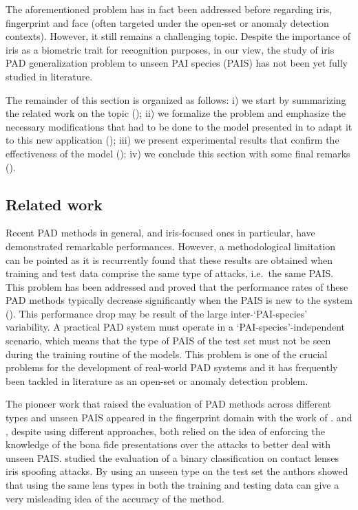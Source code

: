 The aforementioned problem has in fact been addressed before regarding iris, fingerprint and face (often targeted under the open-set or anomaly detection contexts). However, it still remains a challenging topic. Despite the importance of iris as a biometric trait for recognition purposes, in our view, the study of iris PAD generalization problem to unseen PAI species (PAIS) has not been yet fully studied in literature.

The remainder of this section is organized as follows: i) we start by summarizing the related work on the topic (); ii) we formalize the problem and emphasize the necessary modifications that had to be done to the model presented in  to adapt it to this new application (); iii) we present experimental results that confirm the effectiveness of the model (); iv) we conclude this section with some final remarks ().

\subsection{Related work}
\label{sec:adv_iris_attack_rel_work}

Recent PAD methods in general, and iris-focused ones in particular, have demonstrated remarkable performances. However, a methodological limitation can be pointed as it is recurrently found that these results are obtained when training and test data comprise the same type of attacks, i.e.\ the same PAIS. This problem has been addressed and proved that the performance rates of these PAD methods typically decrease significantly when the PAIS is new to the system (\citet{marasco2011robustness,bowyer2014cosmetic,sequeira2016realistic}). This performance drop may be result of the large inter-`PAI-species' variability. A practical PAD system must operate in a `PAI-species'-independent scenario, which means that the type of PAIS of the test set must not be seen during the training routine of the models. This problem is one of the crucial problems for the development of real-world PAD systems and it has frequently been tackled in literature as an open-set or anomaly detection problem.

The pioneer work that raised the evaluation of PAD methods across different types and unseen PAIS appeared in the fingerprint domain with the work of \citet{marasco2011robustness}. \citet{rattani2015openset} and \citet{sequeira2015fingerprint}, despite using different approaches, both relied on the idea of enforcing the knowledge of the bona fide presentations over the attacks to better deal with unseen PAIS. \citet{bowyer2014cosmetic} studied the evaluation of a binary classification on contact lenses iris spoofing attacks. By using an unseen type on the test set the authors showed that using the same lens types in both the training and testing data can give a very misleading idea of the accuracy of the method.

